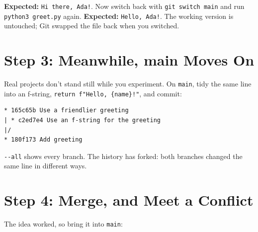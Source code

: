 \textbf{Expected:} \texttt{Hi\ there,\ Ada!}. Now switch back with \texttt{git\ switch\ main} and run \texttt{python3\ greet.py} again. \textbf{Expected:} \texttt{Hello,\ Ada!}. The working version is untouched; Git swapped the file back when you switched.


\section{Step 3: Meanwhile, main Moves On}\label{10-lab-try-an-idea-without-breaking-anything:step-3-meanwhile-main-moves-on}

Real projects don't stand still while you experiment. On \texttt{main}, tidy the same line into an f-string, \texttt{return\ f"Hello,}\allowbreak{}\texttt{\ \{name\}!"}, and commit:

\begin{codeblock}

\begin{Shaded}
\begin{Highlighting}[]
 
  
\end{Highlighting}
\end{Shaded}

\end{codeblock}

\begin{codeblock}
\begin{Verbatim}[formatcom=\outputstyle]
* 165c65b Use a friendlier greeting
| * c2ed7e4 Use an f-string for the greeting
|/  
* 180f173 Add greeting
\end{Verbatim}
\end{codeblock}

\texttt{-\/-all} shows every branch. The history has forked: both branches changed the same line in different ways.


\section{Step 4: Merge, and Meet a Conflict}\label{10-lab-try-an-idea-without-breaking-anything:step-4-merge-and-meet-a-conflict}

The idea worked, so bring it into \texttt{main}:

